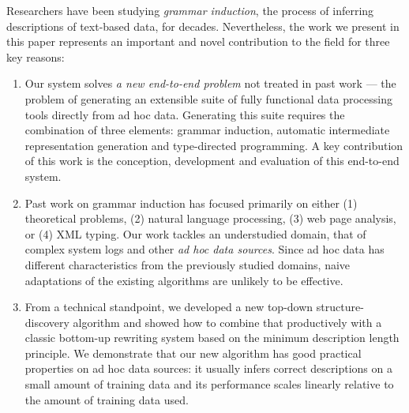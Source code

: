 Researchers have been studying {\em grammar induction}, the process of
inferring descriptions of text-based data, for decades.  Nevertheless,
the work we present in this paper represents an important and novel 
contribution to the field for three key reasons:

\begin{enumerate}
\item Our system solves {\em a new end-to-end problem} not treated in
past work --- the problem of generating an extensible suite of fully
functional data processing tools directly from ad hoc data.  
Generating this suite requires the combination of three elements:
grammar induction, automatic intermediate representation generation
and type-directed programming.  A key contribution of this work is the
conception, development and evaluation of this end-to-end system.


\item Past work on grammar induction has focused primarily on
either (1) theoretical problems, (2) natural language processing, 
(3) web page analysis, or
(4) XML typing.  Our work tackles an understudied domain, that of complex system
logs and other {\em ad hoc data sources}.  Since ad hoc data has
different characteristics from the previously studied domains, naive
adaptations of the existing algorithms are unlikely to be %
effective.  

\item  From a technical standpoint, we developed a new top-down 
structure-discovery algorithm and showed how to combine that 
productively with a classic bottom-up rewriting system based on 
the minimum description length principle. We demonstrate that our
new algorithm has good practical properties on ad hoc data sources:  
it usually infers correct descriptions on a small amount of training
data and its performance scales linearly relative to the amount of training
data used.
\end{enumerate}

